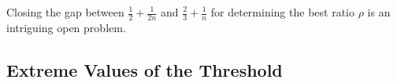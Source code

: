 \documentclass{article}
\begin{document}
\begin{comment}

The {\sc random dictator} rule selects  an agent according to a given distribution of probabilities, and the solution is the declaration of that agent. Here, we %
consider the uniform 
distribution. 

\begin{theorem} \label{thm_rand_dict} The expected number of agents covered by the {\sc random dictator} rule is at least $\frac{n+1}{2}$. 
\end{theorem}
\begin{proof} We consider the same allocation of points as in the proof of Theorem \ref{thm_dict}. Let $p_i$ be the number of points collected by agent $i$. Thus, $\sum_{i \in N} p_i \ge \frac{n(n-1)}{2}$, and we know that every agent $i$'s declaration covers $1+p_i$ agents (an agent always covers herself). The expected number of covered agents is $\sum_{i \in N} \frac{1}{n}(1+p_i)=\frac{1}{n}\sum_{i \in N} (1+p_i) \ge \frac{1}{n}(n+\frac{n(n-1)}{2})=\frac{n+1}{2}$.    
\end{proof}



\commentLaurent{Can we give a better lower bound for {\sc random dictator}, or there exists a tight instance for any $n$ and $m$?}

There is a need for tight instances for the two rules. Note that Instance \ref{example1} is tight for {\sc dictator} when $m=3$. We can have as many agents as wanted if we say that $n_i \ge 1$ agents have declared line $i$. We can extend Instance   \ref{example1} to $m=3k$ projects by replacing each project by $k$ clones. If agent $i$ has declared $\dell^i_j$ for a project $j$ in Instance  \ref{example1} then suppose agent $i$ has declared $\dell^i_j/k$ for each of its clones.

\end{comment}

Closing the gap between $\frac{1}{2}+\frac{1}{2n}$ and $\frac{2}{3}+\frac{1}{n}$ for determining the best ratio $\rho$ is an intriguing open problem. 

\subsection{Extreme Values of the Threshold}
\end{document}
